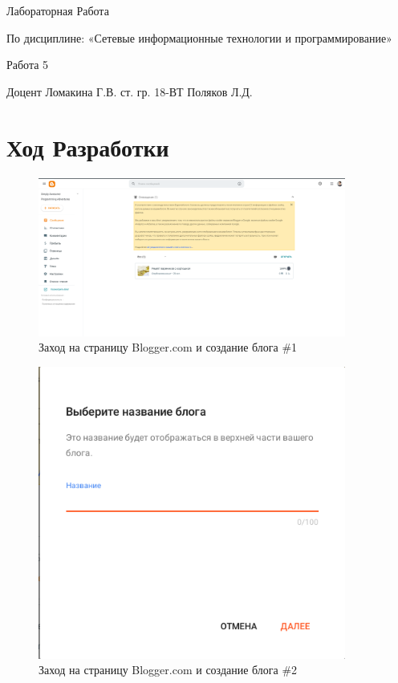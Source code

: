 \documentclass[14pt]{extarticle}
\let\oldsection\section
\renewcommand\section{\clearpage\oldsection}
\begin{document}
\unititle
{\klgtu}
{\fapu}
{\suvt}
{Лабораторная Работа}
{По дисциплине: «Сетевые информационные технологии и программирование» \par Работа 5}
{Доцент}
{Ломакина Г.В.}
{ст. гр. 18-ВТ}
{Поляков Л.Д.}

\tableofcontents


\section{Ход Разработки}

\begin{figure}[h]
    \centering
	\includegraphics[width=0.9\textwidth, angle=0]{2021-12-12_21-10}
    \caption{Заход на страницу Blogger.com и создание блога \#1}
    \label{fig:html1}
\end{figure}

\begin{figure}[h]
    \centering
	\includegraphics[width=0.9\textwidth, angle=0]{2021-12-12_21-41}
    \caption{Заход на страницу Blogger.com и создание блога \#2}
    \label{fig:html2}
\end{figure}
\end{document}
